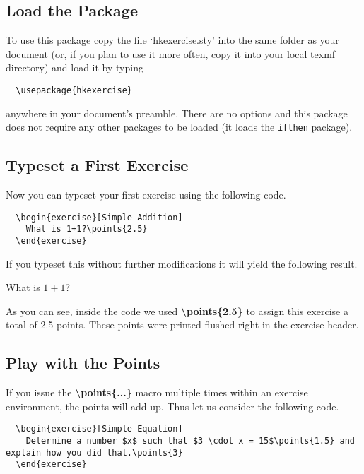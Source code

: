 \documentclass[
  twocolumn,%
  fontsize=9pt,%
  DIV=calc,%
  numbers=noendperiod%
]{scrartcl}
\begin{document}
\subsection{Load the Package}
To use this package copy the file `hkexercise.sty' into the same folder as your document (or, if you plan to use it more often, copy it into your local texmf directory) and load it by typing
\begin{lstlisting}
  \usepackage{hkexercise}
\end{lstlisting}
anywhere in your document's preamble. There are no options and this package does not require any other packages to be loaded (it loads the \texttt{ifthen} package).

\subsection{Typeset a First Exercise}
Now you can typeset your first exercise using the following code.

\begin{lstlisting}
  \begin{exercise}[Simple Addition]
    What is 1+1?\points{2.5}
  \end{exercise}
\end{lstlisting}

\noindent If you typeset this without further modifications it will yield the following result.

\begin{exercise}
  What is $1+1$?
\end{exercise} 

\noindent As you can see, inside the code we used \textcolor{NavyBlue}{\ttfamily\bfseries \textbackslash points\{2.5\}} to assign this exercise a total of 2.5 points. These points were printed flushed right in the exercise header.

\subsection{Play with the Points}
If you issue the  \textcolor{NavyBlue}{\ttfamily\bfseries \textbackslash points\{...\}} macro multiple times within an exercise environment, the points will add up. Thus let us consider the following code.

\begin{lstlisting}
  \begin{exercise}[Simple Equation]
    Determine a number $x$ such that $3 \cdot x = 15$\points{1.5} and explain how you did that.\points{3}
  \end{exercise} 
\end{lstlisting}
\end{document}
